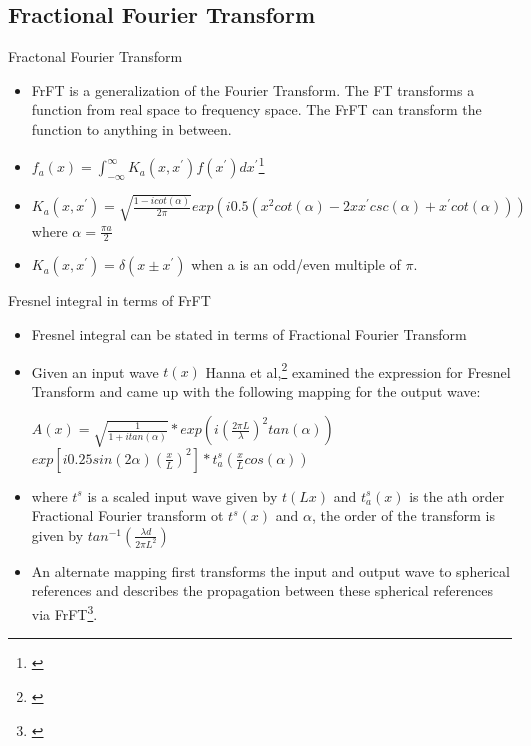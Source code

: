\documentclass{beamer}
\begin{document}
\subsection{Fractional Fourier Transform}
\begin{frame}{Fractonal Fourier Transform}
\begin{itemize}
	\item FrFT is a generalization of the Fourier Transform. The FT transforms a function from real space to frequency space. The FrFT can transform the function to anything in between. 
	
	\item $f_{a}(x) = \int_{-\infty}^{\infty}K_{a}(x,x^{'})f(x^{'})dx^{'}$\footnote{\cite{Hanna2011}}
	
	\item 
	$K_{a}(x,x^{'}) = \sqrt{\frac{1-icot(\alpha)}{2\pi}}exp(i0.5(x^{2}cot(\alpha)-2xx^{'}csc(\alpha)+x^{'}cot(\alpha)))$
	where $\alpha = \frac{\pi a}{2}$
	\item 	$K_{a}(x,x^{'}) = \delta(x\pm x^{'})$ when a is an odd/even multiple of $\pi$.

\end{itemize}
\end{frame}

\begin{frame}{Fresnel integral in terms of FrFT}
\begin{itemize}
	\item Fresnel integral can be stated in terms of Fractional Fourier Transform
	\item Given an input wave $t(x)$ Hanna et al,\footnote{\cite{Hanna2011}} examined the expression for Fresnel Transform and came up with the following mapping for the output wave:\\
	\begin{center}
		$A(x) = \sqrt{\frac{1}{1+itan(\alpha)}}*exp(i(\frac{2\pi L}{\lambda})^{2}tan(\alpha))$
		$exp[i0.25sin(2\alpha)(\frac{x}{L})^{2}]*t^{s}_{a}(\frac{x}{L}cos(\alpha))$
	\end{center}
	\item where $t^{s}$ is a scaled input wave given by $t(Lx)$ and $t_{a}^{s}(x)$ is the ath order Fractional Fourier transform ot $t^{s}(x)$ and $\alpha$, the order of the transform is given by $tan^{-1}(\frac{\lambda d}{2\pi L^{2}})$
	\item An alternate mapping first transforms the input and output wave to spherical references and describes the propagation between these spherical references via FrFT\footnote{\cite{Ozaktas95}}.
\end{itemize}
\end{frame}
\end{document}
